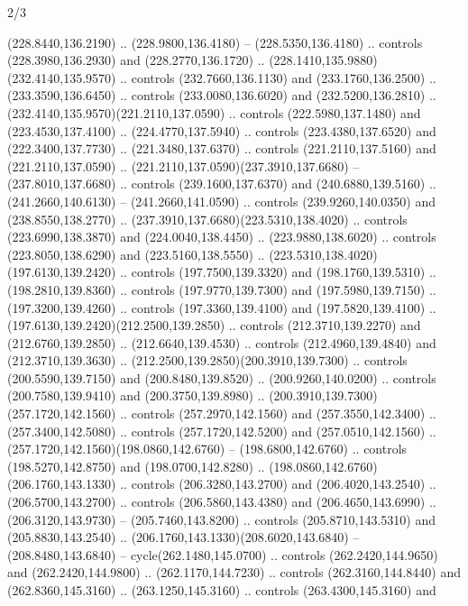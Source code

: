 \begin{flagdescription}{2/3}
\begin{scope}[xshift=0.5\flaglength,yshift=0.5\flagwidth,scale=\flagwidth/259.2]
\begin{scope}[y=0.8pt, x=0.8pt, yscale=-1,shift={(-243,-162)}]
      (228.8440,136.2190) .. (228.9800,136.4180) -- (228.5350,136.4180) .. controls
      (228.3980,136.2930) and (228.2770,136.1720) ..
      (228.1410,135.9880)(232.4140,135.9570) .. controls (232.7660,136.1130) and
      (233.1760,136.2500) .. (233.3590,136.6450) .. controls (233.0080,136.6020) and
      (232.5200,136.2810) .. (232.4140,135.9570)(221.2110,137.0590) .. controls
      (222.5980,137.1480) and (223.4530,137.4100) .. (224.4770,137.5940) .. controls
      (223.4380,137.6520) and (222.3400,137.7730) .. (221.3480,137.6370) .. controls
      (221.2110,137.5160) and (221.2110,137.0590) ..
      (221.2110,137.0590)(237.3910,137.6680) -- (237.8010,137.6680) .. controls
      (239.1600,137.6370) and (240.6880,139.5160) .. (241.2660,140.6130) --
      (241.2660,141.0590) .. controls (239.9260,140.0350) and (238.8550,138.2770) ..
      (237.3910,137.6680)(223.5310,138.4020) .. controls (223.6990,138.3870) and
      (224.0040,138.4450) .. (223.9880,138.6020) .. controls (223.8050,138.6290) and
      (223.5160,138.5550) .. (223.5310,138.4020)(197.6130,139.2420) .. controls
      (197.7500,139.3320) and (198.1760,139.5310) .. (198.2810,139.8360) .. controls
      (197.9770,139.7300) and (197.5980,139.7150) .. (197.3200,139.4260) .. controls
      (197.3360,139.4100) and (197.5820,139.4100) ..
      (197.6130,139.2420)(212.2500,139.2850) .. controls (212.3710,139.2270) and
      (212.6760,139.2850) .. (212.6640,139.4530) .. controls (212.4960,139.4840) and
      (212.3710,139.3630) .. (212.2500,139.2850)(200.3910,139.7300) .. controls
      (200.5590,139.7150) and (200.8480,139.8520) .. (200.9260,140.0200) .. controls
      (200.7580,139.9410) and (200.3750,139.8980) ..
      (200.3910,139.7300)(257.1720,142.1560) .. controls (257.2970,142.1560) and
      (257.3550,142.3400) .. (257.3400,142.5080) .. controls (257.1720,142.5200) and
      (257.0510,142.1560) .. (257.1720,142.1560)(198.0860,142.6760) --
      (198.6800,142.6760) .. controls (198.5270,142.8750) and (198.0700,142.8280) ..
      (198.0860,142.6760)(206.1760,143.1330) .. controls (206.3280,143.2700) and
      (206.4020,143.2540) .. (206.5700,143.2700) .. controls (206.5860,143.4380) and
      (206.4650,143.6990) .. (206.3120,143.9730) -- (205.7460,143.8200) .. controls
      (205.8710,143.5310) and (205.8830,143.2540) ..
      (206.1760,143.1330)(208.6020,143.6840) -- (208.8480,143.6840) --
      cycle(262.1480,145.0700) .. controls (262.2420,144.9650) and
      (262.2420,144.9800) .. (262.1170,144.7230) .. controls (262.3160,144.8440) and
      (262.8360,145.3160) .. (263.1250,145.3160) .. controls (263.4300,145.3160) and

\end{scope}
\end{scope}
\end{flagdescription}
